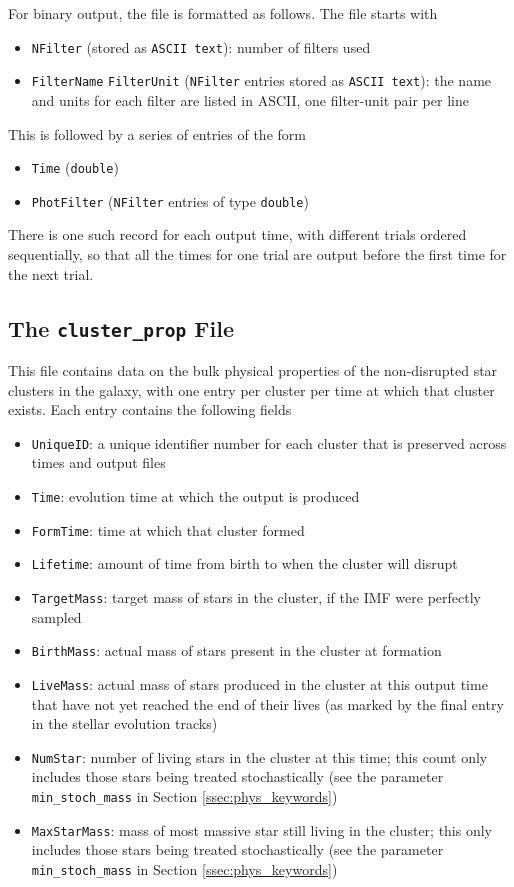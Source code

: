 \documentclass[12pt]{article}
\begin{document}
For binary output, the file is formatted as follows. The file starts with
\begin{itemize}
\item \verb=NFilter= (stored as \verb=ASCII text=): number of filters used
\item \verb=FilterName= \verb=FilterUnit= (\verb=NFilter= entries stored as \verb=ASCII text=): the name and units for each filter are listed in ASCII, one filter-unit pair per line
\end{itemize}
This is followed by a series of entries of the form
\begin{itemize}
\item \verb=Time= (\verb=double=)
\item \verb=PhotFilter= (\verb=NFilter= entries of type \verb=double=)
\end{itemize}
There is one such record for each output time, with different trials ordered sequentially, so that all the times for one trial are output before the first time for the next trial.

\subsection{The \texttt{cluster\_prop} File}

This file contains data on the bulk physical properties of the non-disrupted star clusters in the galaxy, with one entry per cluster per time at which that cluster exists. Each entry contains the following fields
\begin{itemize}
\item \verb=UniqueID=: a unique identifier number for each cluster that is preserved across times and output files
\item \verb=Time=: evolution time at which the output is produced
\item \verb=FormTime=: time at which that cluster formed
\item \verb=Lifetime=: amount of time from birth to when the cluster will disrupt
\item \verb=TargetMass=: target mass of stars in the cluster, if the IMF were perfectly sampled
\item \verb=BirthMass=: actual mass of stars present in the cluster at formation
\item \verb=LiveMass=: actual mass of stars produced in the cluster at this output time that have not yet reached the end of their lives (as marked by the final entry in the stellar evolution tracks)
\item \verb=NumStar=: number of living stars in the cluster at this time; this count only includes those stars being treated stochastically (see the parameter \verb=min_stoch_mass= in Section \ref{ssec:phys_keywords})
\item \verb=MaxStarMass=: mass of most massive star still living in the cluster; this only includes those stars being treated stochastically (see the parameter \verb=min_stoch_mass= in Section \ref{ssec:phys_keywords})
\end{itemize}
\end{document}

